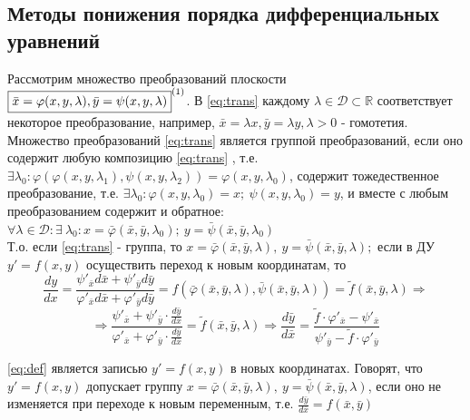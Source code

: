 \subsection*{Методы понижения порядка дифференциальных уравнений}
\begin{proposition}

	Рассмотрим множество преобразований плоскости \\ $ \boxed{\bar{x} = \varphi(x,y,\lambda), \bar{y} = \psi (x,y,\lambda)}^{\eqnum\label{eq:trans}} $. В \eqref{eq:trans} каждому $ \lambda \in \mathcal{ D }  \subset \mathbb{ R } $ соответствует некоторое преобразование, например, $ \bar{x} = \lambda x, \bar{y} = \lambda y, \lambda > 0 $ - гомотетия. Множество преобразований \eqref{eq:trans}  является группой преобразований, если оно содержит любую композицию \eqref{eq:trans} , т.е. 
	$ \exists \lambda_0 : \varphi(\varphi(x,y,\lambda_1), \psi(x,y,\lambda_2)) = \varphi(x,y,\lambda_0) $, содержит тожедественное преобразование, т.е. $ \exists \lambda_0: \varphi(x,y,\lambda_0) = x; \ \psi(x,y,\lambda_0) = y $, и вместе с любым преобразованием содержит и обратное: $ \forall \lambda \in \mathcal{D} \colon  \exists \ \lambda_0 \colon x = \bar{ \varphi } (\bar{x}, \bar{y}, \lambda_0); \ y = \bar{ \psi } (\bar{x}, \bar{y}, \lambda_0) $ \\
	Т.о. если \eqref{eq:trans} - группа, то $ x = \bar{ \varphi } (\bar{x}, \bar{y}, \lambda), \ y = \bar{ \psi } (\bar{x}, \bar{y}, \lambda);$ если в ДУ $ y' = f(x,y)$ осуществить переход к новым координатам, то \\
	$$
	\frac{dy}{dx} = \frac{ \psi'_{ \bar{x} } d\bar{x} +  \psi'_{ \bar{y} } d\bar{y} }{ \varphi'_{\bar{x}} d\bar{x} +  \varphi'_{\bar{y}} d\bar{y}} = f(\bar{ \varphi }(\bar{x}, \bar{y}, \lambda), \bar{ \psi }(\bar{x}, \bar{y}, \lambda)) = \tilde{f}(\bar{x}, \bar{y}, \lambda) \Rightarrow
	$$	
	\begin{equation} \label{eq:def}
	\Rightarrow \frac{ \psi'_{ \bar{x} } + \psi'_{ \bar{y} } \cdot \frac{d\bar{y}}{d\bar{x}} }{ \varphi'_{\bar{x}} +  \varphi'_{\bar{y}} \cdot \frac{d\bar{y}}{d\bar{x}} } = \tilde{f}(\bar{x}, \bar{y}, \lambda) \Rightarrow \frac{d\bar{y}}{d\bar{x}} = \frac{\tilde{f} \cdot \varphi'_{\bar{x}} - \psi'_{\bar{x} }}{\psi'_{\bar{y}} - \tilde{f} \cdot \varphi'_{\bar{y}}}
	\end{equation}  
	
	\eqref{eq:def} является записью $ y' = f(x,y) $ в новых координатах. Говорят, что $ y' = f(x,y) $ допускает группу $ x =\bar{ \varphi }(\bar{x}, \bar{y}, \lambda), \ y = \bar{ \psi } (\bar{x}, \bar{y}, \lambda)$, если оно не изменяется при переходе к новым переменным, т.е. $ \frac{d\bar{y}}{d\bar{x}} = f(\bar{x}, \bar{y}) $
\end{proposition}

